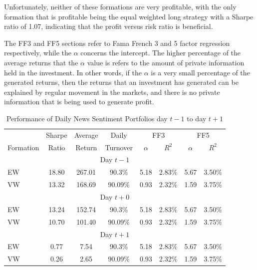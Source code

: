 Unfortunately, neither of these formations are very profitable, with the only formation that is profitable being the equal weighted long strategy with a Sharpe ratio of 1.07, indicating that the profit versus risk ratio is beneficial. 

The FF3 and FF5 sections refer to Fama French 3 and 5 factor regression respectively, while the $\alpha$ concerns the intercept. The higher percentage of the average returns that the $\alpha$ value is refers to the amount of private information held in the investment. In other words, if the $\alpha$ is a very small percentage of the generated returns, then the returns that an investment has generated can be explained by regular movement in the markets, and there is no private information that is being used to generate profit.




\begin{table}[!ht]
\begin{center}
\begin{tabular}{lccccccc}
      \toprule
      & Sharpe &  Average & Daily & \multicolumn{2}{c}{FF3} & \multicolumn{2}{c}{FF5} \\
      \cmidrule(lr){5-6}
      \cmidrule(lr){7-8}
      Formation & Ratio & Return & Turnover & $\alpha$ & $R^2$ & $\alpha$ & $R^2$ \\
      \midrule
      \multicolumn{8}{c}{Day $t-1$} \\
      EW & 18.80 & 267.01 & 90.3\% & 5.18 & 2.83\% & 5.67 & 3.50\% \\
      VW & 13.32 & 168.69 & 90.09\% & 0.93 & 2.32\% & 1.59 & 3.75\% \\
      \multicolumn{8}{c}{Day $t+0$} \\
      EW & 13.24 & 152.74 & 90.3\% & 5.18 & 2.83\% & 5.67 & 3.50\% \\
      VW & 10.70 & 101.40 & 90.09\% & 0.93 & 2.32\% & 1.59 & 3.75\% \\
      \multicolumn{8}{c}{Day $t+1$} \\
      EW & 0.77 & 7.54 & 90.3\% & 5.18 & 2.83\% & 5.67 & 3.50\% \\
      VW & 0.26 & 2.65 & 90.09\% & 0.93 & 2.32\% & 1.59 & 3.75\% \\
      \bottomrule
\end{tabular}
\caption{Performance of Daily News Sentiment Portfolios day $t-1$ to day $t+1$}
\label{portfolio-performance-day-1}
\end{center}
\end{table}

